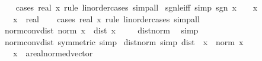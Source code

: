 \begin{isabellebody}
%
\isadelimproof
\ \ %
\endisadelimproof
%
\isatagproof
{}\isamarkupfalse%
\ {\isacharparenleft}{\kern0pt}cases\ {\isachardoublequoteopen}{}{\isacharcolon}{\kern0pt}{\isacharcolon}{\kern0pt}real{\isachardoublequoteclose}\ x\ rule{\isacharcolon}{\kern0pt}\ linorder{\isacharunderscore}{\kern0pt}cases{\isacharparenright}{\kern0pt}\ simp{\isacharunderscore}{\kern0pt}all%
\endisatagproof
{\isafoldproof}%
%
\isadelimproof
\isanewline
%
\endisadelimproof
\isanewline
{}\isamarkupfalse%
\ sgn{\isacharunderscore}{\kern0pt}le{\isacharunderscore}{\kern0pt}{}{\isacharunderscore}{\kern0pt}iff\ {\isacharbrackleft}{\kern0pt}simp{\isacharbrackright}{\kern0pt}{\isacharcolon}{\kern0pt}\ {\isachardoublequoteopen}sgn\ x\ {\isasymle}\ {}\ {\isasymlongleftrightarrow}\ x\ {\isasymle}\ {}{\isachardoublequoteclose}\isanewline
\ \ \ x\ {\isacharcolon}{\kern0pt}{\isacharcolon}{\kern0pt}\ real\isanewline
%
\isadelimproof
\ \ %
\endisadelimproof
%
\isatagproof
{}\isamarkupfalse%
\ {\isacharparenleft}{\kern0pt}cases\ {\isachardoublequoteopen}{}{\isacharcolon}{\kern0pt}{\isacharcolon}{\kern0pt}real{\isachardoublequoteclose}\ x\ rule{\isacharcolon}{\kern0pt}\ linorder{\isacharunderscore}{\kern0pt}cases{\isacharparenright}{\kern0pt}\ simp{\isacharunderscore}{\kern0pt}all%
\endisatagproof
{\isafoldproof}%
%
\isadelimproof
\isanewline
%
\endisadelimproof
\isanewline
{}\isamarkupfalse%
\ norm{\isacharunderscore}{\kern0pt}conv{\isacharunderscore}{\kern0pt}dist{\isacharcolon}{\kern0pt}\ {\isachardoublequoteopen}norm\ x\ {\isacharequal}{\kern0pt}\ dist\ x\ {}{\isachardoublequoteclose}\isanewline
%
\isadelimproof
\ \ %
\endisadelimproof
%
\isatagproof
{}\isamarkupfalse%
\ dist{\isacharunderscore}{\kern0pt}norm\ \isamarkupfalse%
\ simp%
\endisatagproof
{\isafoldproof}%
%
\isadelimproof
\isanewline
%
\endisadelimproof
\isanewline
{}\isamarkupfalse%
\ norm{\isacharunderscore}{\kern0pt}conv{\isacharunderscore}{\kern0pt}dist\ {\isacharbrackleft}{\kern0pt}symmetric{\isacharcomma}{\kern0pt}\ simp{\isacharbrackright}{\kern0pt}\isanewline
\isanewline
{}\isamarkupfalse%
\ dist{\isacharunderscore}{\kern0pt}{}{\isacharunderscore}{\kern0pt}norm\ {\isacharbrackleft}{\kern0pt}simp{\isacharbrackright}{\kern0pt}{\isacharcolon}{\kern0pt}\ {\isachardoublequoteopen}dist\ {}\ x\ {\isacharequal}{\kern0pt}\ norm\ x{\isachardoublequoteclose}\isanewline
\ \ \ x\ {\isacharcolon}{\kern0pt}{\isacharcolon}{\kern0pt}\ {\isachardoublequoteopen}{\isacharprime}{\kern0pt}a{\isacharcolon}{\kern0pt}{\isacharcolon}{\kern0pt}real{\isacharunderscore}{\kern0pt}normed{\isacharunderscore}{\kern0pt}vector{\isachardoublequoteclose}\isanewline

\end{isabellebody}
